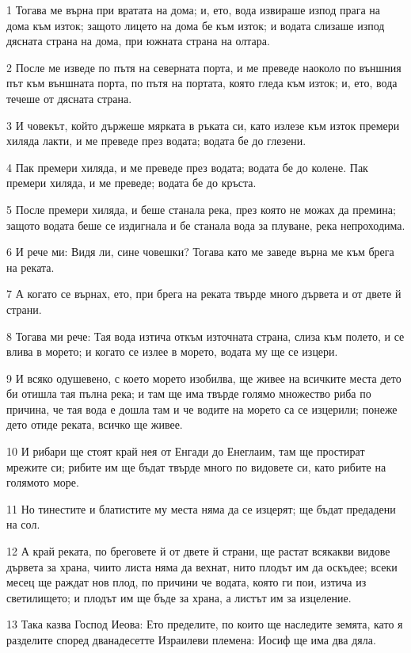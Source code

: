 \par 1 Тогава ме върна при вратата на дома; и, ето, вода извираше изпод прага на дома към изток; защото лицето на дома бе към изток; и водата слизаше изпод дясната страна на дома, при южната страна на олтара.
\par 2 После ме изведе по пътя на северната порта, и ме преведе наоколо по външния път към външната порта, по пътя на портата, която гледа към изток; и, ето, вода течеше от дясната страна.
\par 3 И човекът, който държеше мярката в ръката си, като излезе към изток премери хиляда лакти, и ме преведе през водата; водата бе до глезени.
\par 4 Пак премери хиляда, и ме преведе през водата; водата бе до колене. Пак премери хиляда, и ме преведе; водата бе до кръста.
\par 5 После премери хиляда, и беше станала река, през която не можах да премина; защото водата беше се издигнала и бе станала вода за плуване, река непроходима.
\par 6 И рече ми: Видя ли, сине човешки? Тогава като ме заведе върна ме към брега на реката.
\par 7 А когато се върнах, ето, при брега на реката твърде много дървета и от двете й страни.
\par 8 Тогава ми рече: Тая вода изтича откъм източната страна, слиза към полето, и се влива в морето; и когато се излее в морето, водата му ще се изцери.
\par 9 И всяко одушевено, с което морето изобилва, ще живее на всичките места дето би отишла тая пълна река; и там ще има твърде голямо множество риба по причина, че тая вода е дошла там и че водите на морето са се изцерили; понеже дето отиде реката, всичко ще живее.
\par 10 И рибари ще стоят край нея от Енгади до Енеглаим, там ще простират мрежите си; рибите им ще бъдат твърде много по видовете си, като рибите на голямото море.
\par 11 Но тинестите и блатистите му места няма да се изцерят; ще бъдат предадени на сол.
\par 12 А край реката, по бреговете й от двете й страни, ще растат всякакви видове дървета за храна, чиито листа няма да вехнат, нито плодът им да оскъдее; всеки месец ще раждат нов плод, по причини че водата, която ги пои, изтича из светилището; и плодът им ще бъде за храна, а листът им за изцеление.
\par 13 Така казва Господ Иеова: Ето пределите, по които ще наследите земята, като я разделите според дванадесетте Израилеви племена: Иосиф ще има два дяла.
